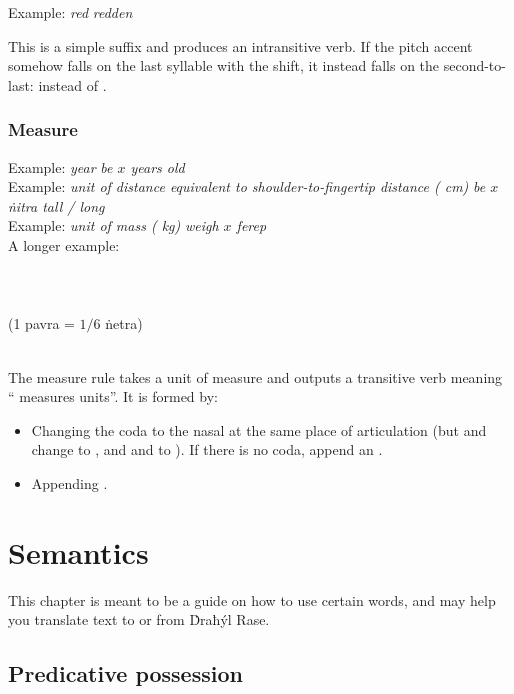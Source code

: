\documentclass{book}
\begin{document}
Example:  \emph{red} \ra{}  \emph{redden}

This is a simple suffix  and produces an intransitive verb. If the pitch accent somehow falls on the last syllable with the shift, it instead falls on the second-to-last:  instead of .

\subsection{Measure}

Example:  \emph{year} \ra{}  \emph{be $x$ years old} \\
Example:  \emph{unit of distance equivalent to shoulder-to-fingertip distance ( cm)} \ra{}  \emph{be $x$ ṅitra tall / long} \\
Example:  \emph{unit of mass ( kg)} \ra{}  \emph{weigh $x$ ferep} \\
A longer example: \\
~\\
  \\
  \\
\emph{  } (1 pavra = $1/6$ ṅetra) \\
~

The measure rule takes a unit of measure and outputs a transitive verb meaning `` measures  units''. It is formed by:

\begin{itemize}
    \item Changing the coda to the nasal at the same place of articulation (but  and  change to , and  and  to ). If there is no coda, append an .
    \item Appending .
\end{itemize}

\chapter{Semantics}

This chapter is meant to be a guide on how to use certain words, and may help you translate text to or from Ḋraħýl Rase.

\section{Predicative possession}
\end{document}
